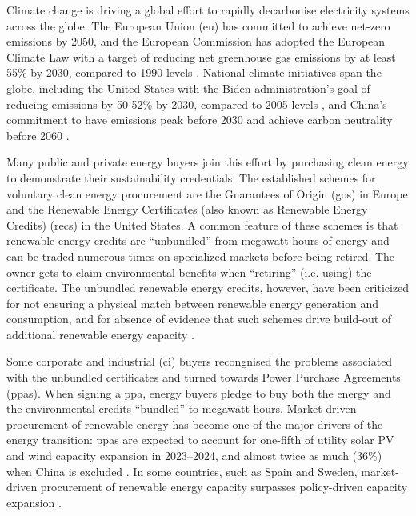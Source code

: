 

Climate change is driving a global effort to rapidly decarbonise electricity systems across the globe. 
The European Union (\gls{eu}) has committed to achieve net-zero emissions by 2050, and the European Commission has adopted the European Climate Law with a target of reducing net greenhouse gas emissions by at least 55\% by 2030, compared to 1990 levels \cite{EuropeanClimateLaw2020}. 
National climate initiatives span the globe, including the United States with the Biden administration's goal of reducing emissions by 50-52\% by 2030, compared to 2005 levels \cite{BidenClimatePlan2021}, and China's commitment to have \co emissions peak before 2030 and achieve carbon neutrality before 2060 \cite{ChinaNetZero-IEA}.


Many public and private energy buyers join this effort by purchasing clean energy to demonstrate their sustainability credentials. The established schemes for voluntary clean energy procurement are the Guarantees of Origin (\gls{go}s) in Europe and the Renewable Energy Certificates (also known as Renewable Energy Credits) (\gls{rec}s) in the United States.
A common feature of these schemes is that renewable energy credits are \enquote{unbundled} from megawatt-hours of energy and can be traded numerous times on specialized markets before being retired.
The owner gets to claim environmental benefits when \enquote{retiring} (i.e. using) the certificate.
The unbundled renewable energy credits, however, have been criticized for not ensuring a physical match between renewable energy generation and consumption, and for absence of evidence that such schemes drive build-out of additional renewable energy capacity \cite{bjorn-RECSnatcom-2022, gillenwater-2014, re100report-2020, spglobal-recs, bock-icelandGOproblem}.

Some corporate and industrial (\gls{ci}) buyers recongnised the problems associated with the unbundled certificates and turned towards Power Purchase Agreements (\gls{ppa}s). 
When signing a \gls{ppa}, energy buyers pledge to buy both the energy and the environmental credits \enquote{bundled} to megawatt-hours.
Market-driven procurement of renewable energy has become one of the major drivers of the energy transition: \gls{ppa}s are expected to account for one-fifth of utility solar PV and wind capacity expansion in 2023--2024, and almost twice as much (36\%) when China is excluded \cite{iea-REppa2023}.
In some countries, such as Spain and Sweden, market-driven procurement of renewable energy capacity surpasses policy-driven capacity expansion \cite{iea-REppa2023}.

